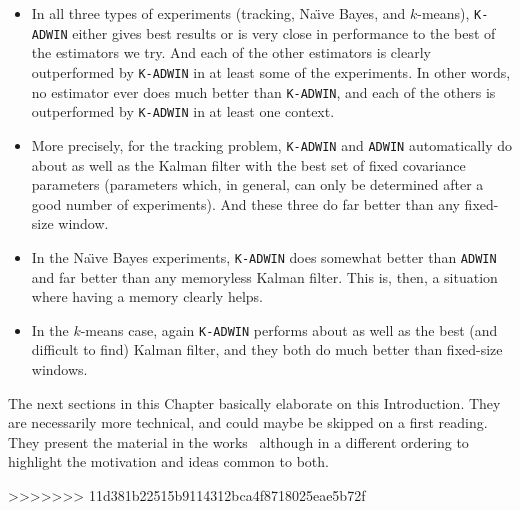 \begin{itemize}
\item In all three types of experiments (tracking, Na\"\i ve Bayes, and $k$-means), 
{\tt K-ADWIN} either gives best results or is very close in performance to the best 
of the estimators we try. And each of the other estimators is 
clearly outperformed by {\tt K-ADWIN}
in at least some of the experiments. In other words, no estimator ever does
much better than {\tt K-ADWIN}, and each of the others 
is outperformed by {\tt K-ADWIN} in at least one context. 
\item More precisely, for the tracking problem, {\tt K-ADWIN} and {\tt ADWIN} automatically
do about as well as the Kalman filter with the best set of fixed covariance parameters
(parameters which, in general, can only be determined after a good number of experiments). 
And these three do far better than any fixed-size window. 
\item In the Na\"\i ve Bayes experiments, {\tt K-ADWIN} does somewhat better than
{\tt ADWIN} and far better than any memoryless Kalman filter. This is, then, 
a situation where having a memory clearly helps. 
\item In the $k$-means case, again {\tt K-ADWIN} performs about as well 
as the best (and difficult to find) Kalman filter, 
and they both do much better than fixed-size windows.
\end{itemize}
\ENDOMIT

{\change
The next sections in this Chapter basically elaborate on this Introduction. They are necessarily more technical, and could maybe be skipped on a first reading. They present the material in the works~\cite{Kbif-gav,bif-gav} %
although in a different ordering to highlight the motivation and ideas common to both.
}

>>>>>>> 11d381b22515b9114312bca4f8718025eae5b72f

